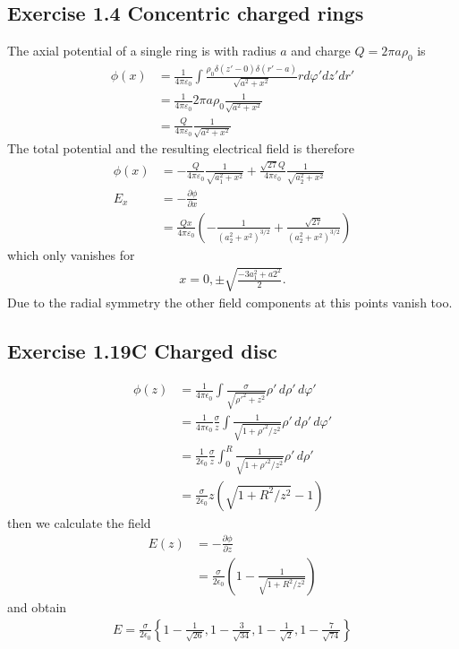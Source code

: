 \documentclass[../main.tex]{subfiles}
\begin{document}
\subsection{Exercise 1.4 Concentric charged rings}
The axial potential of a single ring is with radius $a$ and charge $Q=2\pi a\rho_0$ is
\begin{align}
    \phi(x)&=\frac{1}{4\pi\varepsilon_0}\int\frac{\rho_0\delta(z'-0)\delta(r'-a)}{\sqrt{a^2+x^2}}r d\varphi' dz' dr'\\
    &=\frac{1}{4\pi\varepsilon_0}2\pi a \rho_0\frac{1}{\sqrt{a^2+x^2}}\\
    &=\frac{Q}{4\pi\varepsilon_0}\frac{1}{\sqrt{a^2+x^2}}
\end{align}
The total potential and the resulting electrical field is therefore
\begin{align}
    \phi(x)&=-\frac{Q}{4\pi\varepsilon_0}\frac{1}{\sqrt{a_1^2+x^2}}+\frac{\sqrt{27}Q}{4\pi\varepsilon_0}\frac{1}{\sqrt{a_2^2+x^2}}\\
    E_x&=-\frac{\partial\phi}{\partial x}\\
    &=\frac{Qx}{4\pi\varepsilon_0}\left(-\frac{1}{(a_2^2+x^2)^{3/2}}+\frac{\sqrt{27}}{(a_2^2+x^2)^{3/2}}\right)
\end{align}
which only vanishes for
\begin{align}
    x=0,\pm\sqrt{\frac{-3a_1^2+a2^2}{2}}.
\end{align}
Due to the radial symmetry the other field components at this points vanish too.

\subsection{Exercise 1.19C Charged disc}
\begin{align}
\phi(z)
&=\frac{1}{4\pi\epsilon_0}\int\frac{\sigma}{\sqrt{\rho'^2+z^2}}\rho'\,d\rho'\,d\varphi'\\
&=\frac{1}{4\pi\epsilon_0}\frac{\sigma}{z}\int\frac{1}{\sqrt{1+\rho'^2/z^2}}\rho'\,d\rho'\,d\varphi'\\
&=\frac{1}{2\epsilon_0}\frac{\sigma}{z}\int_0^R\frac{1}{\sqrt{1+\rho'^2/z^2}}\rho'\,d\rho'\\
&=\frac{\sigma}{2\epsilon_0}z\left(\sqrt{1+R^2/z^2}-1\right)
\end{align}
then we calculate the field
\begin{align}
E(z)&=-\frac{\partial\phi}{\partial z}\\
&=\frac{\sigma}{2\epsilon_0}\left(1-\frac{1}{\sqrt{1+R^2/z^2}}\right)
\end{align}
and obtain
\begin{align}
E=\frac{\sigma}{2\epsilon_0}\left\{1-\frac{1}{\sqrt{26}},1-\frac{3}{\sqrt{34}},1-\frac{1}{\sqrt{2}},1-\frac{7}{\sqrt{74}}\right\}
\end{align}
\end{document}

